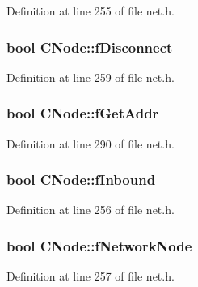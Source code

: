Definition at line 255 of file net.\+h.

\hypertarget{class_c_node_af2f7ea958313974e8a948292f060922e}{}
\subsubsection[{f\+Disconnect}]{\setlength{\rightskip}{0pt plus 5cm}bool C\+Node\+::f\+Disconnect}\label{class_c_node_af2f7ea958313974e8a948292f060922e}


Definition at line 259 of file net.\+h.

\hypertarget{class_c_node_a3da9c559959e182aff8439cd004ff624}{}
\subsubsection[{f\+Get\+Addr}]{\setlength{\rightskip}{0pt plus 5cm}bool C\+Node\+::f\+Get\+Addr}\label{class_c_node_a3da9c559959e182aff8439cd004ff624}


Definition at line 290 of file net.\+h.

\hypertarget{class_c_node_a64b2550ec558b6106ebc122d450ad35b}{}
\subsubsection[{f\+Inbound}]{\setlength{\rightskip}{0pt plus 5cm}bool C\+Node\+::f\+Inbound}\label{class_c_node_a64b2550ec558b6106ebc122d450ad35b}


Definition at line 256 of file net.\+h.

\hypertarget{class_c_node_a933adb2b192939545a01d602b1d7b53a}{}
\subsubsection[{f\+Network\+Node}]{\setlength{\rightskip}{0pt plus 5cm}bool C\+Node\+::f\+Network\+Node}\label{class_c_node_a933adb2b192939545a01d602b1d7b53a}


Definition at line 257 of file net.\+h.

\hypertarget{class_c_node_a2bb91c9968a9f855c05b1121100a8797}{}
